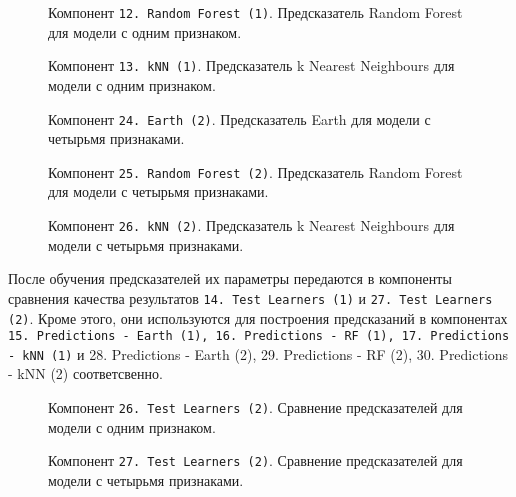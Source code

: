\begin{figure}[H]
    \center{\texttt{[image: 12-RF-1]}}
    \caption{Компонент \texttt{12. Random Forest (1)}. Предсказатель Random Forest для модели с одним признаком.}
    \label{img:12-RF-1}
\end{figure}

\begin{figure}[H]
    \caption{Компонент \texttt{13. kNN (1)}. Предсказатель k Nearest Neighbours для модели с одним признаком.}
    \label{img:13-kNN-1}
\end{figure}

\begin{figure}[H]
    \caption{Компонент \texttt{24. Earth (2)}. Предсказатель Earth для модели с четырьмя признаками.}
    \label{img:24-Earth-2}
\end{figure}

\begin{figure}[H]
    \center{\texttt{[image: 25-RF-2]}}
    \caption{Компонент \texttt{25. Random Forest (2)}. Предсказатель Random Forest для модели с четырьмя признаками.}
    \label{img:25-RF-2}
\end{figure}

\begin{figure}[H]
    \caption{Компонент \texttt{26. kNN (2)}. Предсказатель k Nearest Neighbours для модели с четырьмя признаками.}
    \label{img:26-kNN-2}
\end{figure}

После обучения предсказателей их параметры передаются в компоненты сравнения качества результатов \texttt{14. Test Learners (1)} и \texttt{27. Test Learners (2)}. Кроме этого, они используются для построения предсказаний в компонентах \texttt{15. Predictions - Earth (1), 16. Predictions - RF (1), 17. Predictions - kNN (1)} и {28. Predictions - Earth (2), 29. Predictions - RF (2), 30. Predictions - kNN (2)} соответсвенно.

\begin{figure}[H]
    \caption{Компонент \texttt{26. Test Learners (2)}. Сравнение предсказателей для модели с одним признаком.}
    \label{img:14-Test-Learners-1}
\end{figure}

\begin{figure}[H]
    \caption{Компонент \texttt{27. Test Learners (2)}. Сравнение предсказателей для модели с четырьмя признаками.}
    \label{img:27-Test-Learners-2}
\end{figure}

